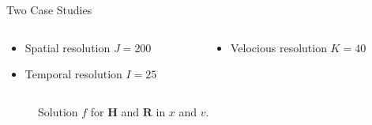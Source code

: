 \documentclass[usenames,dvipsnames,Nike,mathserif]{tuberlinbeamer}
\begin{document}
\begin{frame}[fragile]{Two Case Studies}
	\begin{columns}
		\begin{column}{.5\textwidth}

			\begin{itemize}
				\item Spatial resolution $J = 200$
				\item Temporal resolution $I = 25$
			\end{itemize}
		\end{column}
		\begin{column}{.5\textwidth}
			\begin{itemize}
				\item Velocious resolution $K = 40$
			\end{itemize}
		\end{column}
	\end{columns}
	\begin{figure}
		 
		 \caption{Solution $f$ for $\mathbf{H}$ and $\mathbf{R}$ in $x$ and $v$.}
	\end{figure}
\end{frame}
\end{document}
